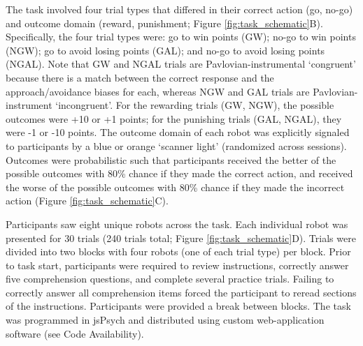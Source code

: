 \documentclass[a4paper,12pt]{article}
\begin{document}
\begin{refsection}[main]
The task involved four trial types that differed in their correct action (go, no-go) and outcome domain (reward, punishment; Figure \ref{fig:task_schematic}B). Specifically, the four trial types were: go to win points (GW); no-go to win points (NGW); go to avoid losing points (GAL); and no-go to avoid losing points (NGAL). Note that GW and NGAL trials are Pavlovian-instrumental `congruent' because there is a match between the correct response and the approach/avoidance biases for each, whereas NGW and GAL trials are Pavlovian-instrument `incongruent'. For the rewarding trials (GW, NGW), the possible outcomes were +10 or +1 points; for the punishing trials (GAL, NGAL), they were -1 or -10 points. The outcome domain of each robot was explicitly signaled to participants by a blue or orange `scanner light' (randomized across sessions). Outcomes were probabilistic such that participants received the better of the possible outcomes with 80\% chance if they made the correct action, and received the worse of the possible outcomes with 80\% chance if they made the incorrect action (Figure \ref{fig:task_schematic}C).

Participants saw eight unique robots across the task. Each individual robot was presented for 30 trials (240 trials total; Figure \ref{fig:task_schematic}D). Trials were divided into two blocks with four robots (one of each trial type) per block. Prior to task start, participants were required to review instructions, correctly answer five comprehension questions, and complete several practice trials. Failing to correctly answer all comprehension items forced the participant to reread sections of the instructions. Participants were provided a break between blocks. The task was programmed in jsPsych \cite{de2015jspsych} and distributed using custom web-application software (see Code Availability). 


\end{refsection}
\end{document}
